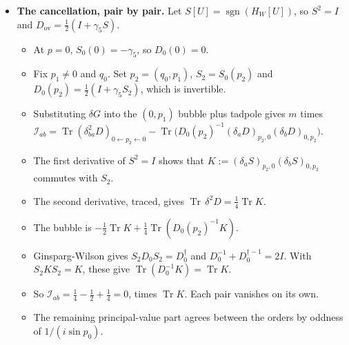 \documentclass[11pt,a4paper]{article}
\begin{document}
\begin{itemize}
\begin{itemize}
\item{} {\bfseries\boldmath The cancellation, pair by pair.} Let $S[U] = \operatorname{sgn}(H_W[U])$, so $S^2 = I$ and $D_{\text{ov}} = \frac{1}{2}(I + \gamma_5 S)$.
\begin{itemize}
\item{} At $p = 0$, $S_0(0) = -\gamma_5$, so $D_0(0) = 0$.
\item{} Fix $p_1 \ne 0$ and $q_0$. Set $p_2 = (q_0, p_1)$, $S_2 = S_0(p_2)$ and $D_0(p_2) = \frac{1}{2}(I + \gamma_5 S_2)$, which is invertible.
\item{} Substituting $\delta G$ into the $(0, p_1)$ bubble plus tadpole gives $m$ times $\mathcal{I}_{ab} = \operatorname{Tr}(\delta_{ba}^2 D)_{0 \leftarrow p_2 \leftarrow 0} - \operatorname{Tr}\big(D_0(p_2)^{-1} (\delta_a D)_{p_2, 0} (\delta_b D)_{0, p_2}\big)$.
\item{} The first derivative of $S^2 = I$ shows that $K := (\delta_a S)_{p_2, 0} (\delta_b S)_{0, p_2}$ commutes with $S_2$.
\item{} The second derivative, traced, gives $\operatorname{Tr}\,\delta^2 D = \frac{1}{4}\operatorname{Tr} K$.
\item{} The bubble is $-\frac{1}{2}\operatorname{Tr} K + \frac{1}{4}\operatorname{Tr}(D_0(p_2)^{-1} K)$.
\item{} Ginsparg-Wilson gives $S_2 D_0 S_2 = D_0^\dagger$ and $D_0^{-1} + D_0^{\dagger -1} = 2I$. With $S_2 K S_2 = K$, these give $\operatorname{Tr}(D_0^{-1} K) = \operatorname{Tr} K$.
\item{} So $\mathcal{I}_{ab} = \frac{1}{4} - \frac{1}{2} + \frac{1}{4} = 0$, times $\operatorname{Tr} K$. Each pair vanishes on its own.
\item{} The remaining principal-value part agrees between the orders by oddness of $1/(i \sin p_0)$.
\end{itemize}


\end{itemize}
\end{itemize}
\end{document}
